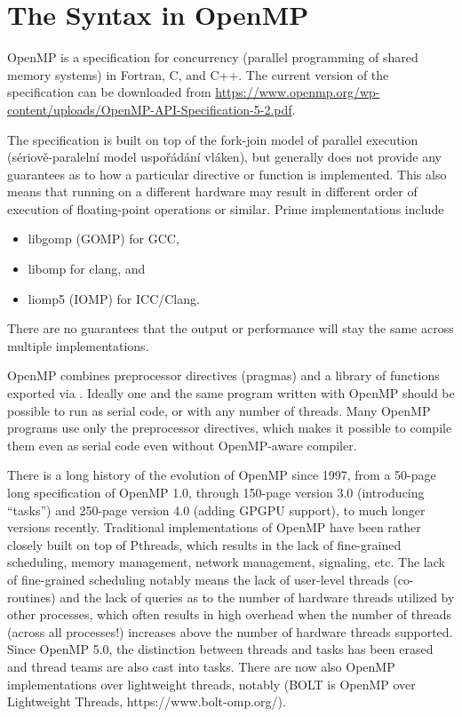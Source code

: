 \chapter{The Syntax in OpenMP}

OpenMP is a specification for concurrency (parallel programming of shared memory systems) in Fortran, C, and C++. 
The current version of the specification can be downloaded from \url{https://www.openmp.org/wp-content/uploads/OpenMP-API-Specification-5-2.pdf}.

The specification is built on top of the fork-join model of parallel execution (sériově-paralelní model uspořádání vláken),
but generally does not provide any guarantees as to how a particular directive or function is implemented. 
This also means that running on a different hardware may result in different order of execution of floating-point operations or similar.  
Prime implementations include 
\begin{itemize}
\item libgomp (GOMP) for GCC, 
\item libomp for clang, and 
\item liomp5 (IOMP) for ICC/Clang.
\end{itemize} 
There are no guarantees that the output or performance will stay the same across multiple implementations. 

OpenMP combines preprocessor directives (pragmas) and a library of functions exported via .
Ideally one and the same program written with OpenMP should be possible to run as serial code, or with any number of threads. 
Many OpenMP programs use only the preprocessor directives, which makes it possible to compile them even as serial code even without OpenMP-aware compiler. 

There is a long history of the evolution of OpenMP since 1997, from a 50-page long specification of OpenMP 1.0, through 150-page version 3.0 (introducing ``tasks'') and 250-page version 4.0 (adding GPGPU support), to much longer versions recently. 
Traditional implementations of OpenMP have been rather closely built on top of Pthreads, 
which results in the lack of fine-grained scheduling, 
memory management, network management, signaling, etc.
The lack of fine-grained scheduling notably means the lack of user-level threads (co-routines)
and the lack of queries as to the number of hardware threads utilized by other processes, 
which often results in high overhead when the number of threads (across all processes!) increases above the number of hardware threads supported.
Since OpenMP 5.0, the distinction between threads and tasks has been erased and thread teams are also cast into tasks. There are now also OpenMP implementations over lightweight threads, notably (BOLT is OpenMP over Lightweight Threads, https://www.bolt-omp.org/). 

